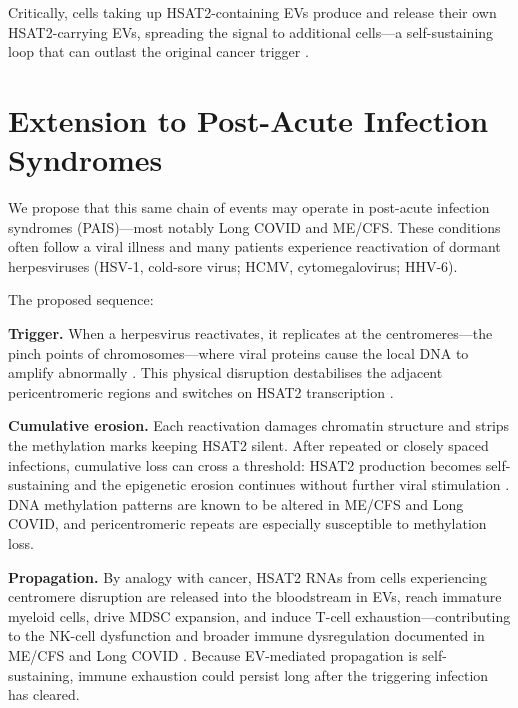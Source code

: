 \documentclass[11pt,a4paper]{scrartcl}
\begin{document}
Critically, cells taking up HSAT2-containing EVs produce and release
their own HSAT2-carrying EVs, spreading the signal to additional
cells---a self-sustaining loop that can outlast the original cancer
trigger \cite{Ruzanov2024ETSsatelliteEV}.

\section{Extension to Post-Acute Infection Syndromes}

We propose that this same chain of events may operate in post-acute
infection syndromes (PAIS)---most notably Long COVID and ME/CFS.
These conditions often follow a viral illness and many patients
experience reactivation of dormant herpesviruses (HSV-1,
cold-sore virus; HCMV, cytomegalovirus; HHV-6).

The proposed sequence:

\textbf{Trigger.}  When a herpesvirus reactivates, it replicates at
the centromeres---the pinch points of chromosomes---where viral
proteins cause the local DNA to amplify abnormally
\cite{Lahaye2025centromere}.  This physical disruption destabilises
the adjacent pericentromeric regions and switches on HSAT2
transcription \cite{Nogalski2019HSATII,Vourc_h2022HSF1SatIII}.

\textbf{Cumulative erosion.}  Each reactivation damages chromatin
structure and strips the methylation marks keeping HSAT2 silent.
After repeated or closely spaced infections, cumulative loss can
cross a threshold: HSAT2 production becomes self-sustaining and
the epigenetic erosion continues without further viral stimulation
\cite{BonnetFourel2026ProAB,
deVega2014methylation,Helliwell2020methylation,
Peppercorn2025methylation,Shadle2019HSATII}.  DNA methylation
patterns are known to be altered in ME/CFS and Long COVID, and
pericentromeric repeats are especially susceptible to methylation
loss.

\textbf{Propagation.}  By analogy with cancer, HSAT2 RNAs from
cells experiencing centromere disruption are released into the
bloodstream in EVs, reach immature myeloid cells, drive MDSC
expansion, and induce T-cell exhaustion---contributing to the
NK-cell dysfunction and broader immune dysregulation documented in
ME/CFS and Long COVID \cite{Ruzanov2024ETSsatelliteEV}.  Because
EV-mediated propagation is self-sustaining, immune exhaustion could
persist long after the triggering infection has cleared.

\end{document}
